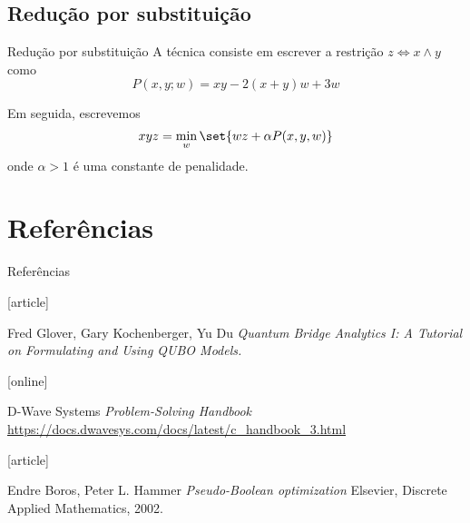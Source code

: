 \documentclass[brazil, MathSerif, aspectratio = 169]{beamer}
\begin{document}
\subsection{Redução por substituição}
\begin{frame}{Redução por substituição\cite{dwave:2016}}
    A técnica consiste em escrever a restrição $z \iff x \wedge y$ como
    $$P(x, y; w) = x y - 2 ( x + y ) w + 3w$$

    Em seguida, escrevemos
    $$x y z = \min_{w} \set{w z + \alpha P(x, y, w)}$$
    onde $\alpha > 1$ é uma constante de penalidade.
\end{frame}

\section{Referências}
\begin{frame}%
    {Referências}

    \begin{thebibliography}{}

        [article]

        Fred Glover, Gary Kochenberger, Yu Du
        \newblock \emph{Quantum Bridge Analytics I: A Tutorial on Formulating and Using QUBO Models.}




        [online]

        D-Wave Systems
        \newblock \emph{Problem-Solving Handbook}
        \newblock \url{https://docs.dwavesys.com/docs/latest/c_handbook_3.html}

        [article]

        Endre Boros, Peter L. Hammer
        \newblock \emph{Pseudo-Boolean optimization}
        \newblock Elsevier, Discrete Applied Mathematics, 2002.
    \end{thebibliography}
\end{frame}
\end{document}

